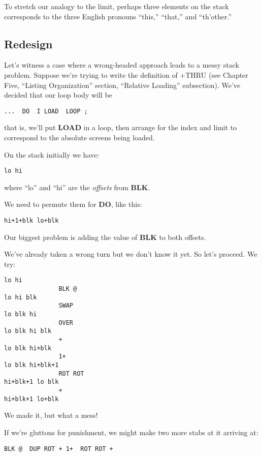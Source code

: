 To stretch our analogy to the limit, perhaps three elements on the
stack corresponds to the three English pronouns ``this,'' ``that,'' and
``th'other.''

\subsection{Redesign}

Let's witness a case where a wrong-headed approach leads to a messy
stack problem. Suppose we're trying to write the definition of +THRU
(see Chapter Five, ``Listing Organization'' section, ``Relative Loading''
subsection). We've decided that our loop body will be

\begin{verbatim}
...  DO  I LOAD  LOOP ;
\end{verbatim}

that is, we'll put \textbf{LOAD} in a loop, then arrange for the index and limit
to correspond to the absolute screens being loaded.

On the stack initially we have:

\begin{verbatim}
lo hi
\end{verbatim}

where ``lo'' and ``hi'' are the \emph{offsets} from \textbf{BLK}.

We need to permute them for \textbf{DO}, like this:

\begin{verbatim}
hi+1+blk lo+blk
\end{verbatim}

Our biggest problem is adding the value of \textbf{BLK} to both offsets.

We've already taken a wrong turn but we don't know it yet. So let's
proceed. We try:

\begin{verbatim}
lo hi
               BLK @
lo hi blk
               SWAP
lo blk hi
               OVER
lo blk hi blk
               +
lo blk hi+blk
               1+
lo blk hi+blk+1
               ROT ROT
hi+blk+1 lo blk
               +
hi+blk+1 lo+blk
\end{verbatim}

We made it, but what a mess!

If we're gluttons for punishment, we might make two more stabs at
it arriving at:

\begin{verbatim}
BLK @  DUP ROT + 1+  ROT ROT +
\end{verbatim}

